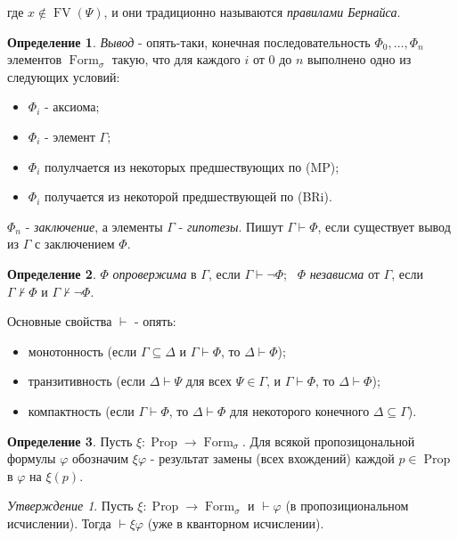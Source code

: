 \documentclass[a4paper,100pt]{article}
\theoremstyle{indented}
\theoremstyle{definition}
\newtheorem{defn}{Определение}
\theoremstyle{remark}
\newtheorem{stat}{Утверждение}
\DeclareMathOperator{\ra}{\rightarrow}
\DeclareMathOperator{\Prop}{Prop}
\DeclareMathOperator{\form}{Form}
\DeclareMathOperator{\FV}{FV}
\begin{document}
где $x \notin \FV(\Psi)$, и они традиционно называются \textit{правилами Бернайса}.

\begin{defn}
  \textit{Вывод} - опять-таки, конечная последовательность $\Phi_0, \ldots, \Phi_n$ элементов $\form_\sigma$ такую, что для каждого $i$ от 0 до $n$ выполнено одно из следующих условий:

  \begin{itemize}
    \item $\Phi_i$ - аксиома; 
    \item $\Phi_i$ - элемент $\Gamma$; 
    \item $\Phi_i$ полулчается из некоторых предшествующих по (MP);
    \item $\Phi_i$ получается из некоторой предшествующей по (BRi). 
  \end{itemize}

  $\Phi_n$ - \textit{заключение}, а элементы $\Gamma$ - \textit{гипотезы}. Пишут $\Gamma \vdash \Phi$, если существует вывод из $\Gamma$ с заключением $\Phi$. 
\end{defn}

\begin{defn}
  $\Phi$ \textit{опровержима} в $\Gamma$, если $\Gamma \vdash \neg \Phi$; \ 
  $\Phi$ \textit{независма} от $\Gamma$, если $\Gamma \nvdash \Phi$ и $\Gamma \nvdash \neg \Phi$. 
\end{defn}

Основные свойства $\vdash$ - опять:

\begin{itemize}
  \item монотонность (если $\Gamma \subseteq \Delta$ и $\Gamma \vdash \Phi$, то $\Delta \vdash \Phi$); 
  \item транзитивность (если $\Delta \vdash \Psi$ для всех $\Psi \in \Gamma$, и $\Gamma \vdash \Phi$, то $\Delta \vdash \Phi$);
  \item компактность (если $\Gamma \vdash \Phi$, то $\Delta \vdash \Phi$ для некоторого конечного $\Delta \subseteq \Gamma$).
\end{itemize}

\begin{defn}
  Пусть $\xi: \Prop \rightarrow \form_\sigma$. Для всякой пропозицональной формулы $\varphi$ обозначим $\xi \varphi$ - результат замены (всех вхождений) каждой $p\in \Prop$ в $\varphi$ на $\xi(p)$. 
\end{defn}

\begin{stat}
  Пусть $\xi: \Prop \ra \form_\sigma$ и $\vdash \varphi$ (в пропозициональном исчислении). Тогда $\vdash \xi\varphi$ (уже в кванторном исчислении).
\end{stat}
\end{document}
